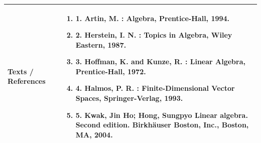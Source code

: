 \documentclass[11pt,a4paper]{article}
\begin{document}
\begin{tabularx}{\textwidth}{|p{3.2cm}|X|}
\hline
\textbf{Texts / References} & \begin{enumerate}[leftmargin=*,noitemsep,topsep=2pt]  \item 1. Artin, M. : Algebra, Prentice-Hall, 1994.  \item 2. Herstein, I. N. : Topics in Algebra, Wiley Eastern, 1987.  \item 3. Hoffman, K. and Kunze, R. : Linear Algebra, Prentice-Hall, 1972.  \item 4. Halmos, P. R. : Finite-Dimensional Vector Spaces, Springer-Verlag, 1993.  \item 5. Kwak, Jin Ho; Hong, Sungpyo Linear algebra. Second edition. Birkhäuser Boston, Inc.,  Boston, MA, 2004.\end{enumerate} \\
\hline
\end{tabularx}
\clearpage
\end{document}
